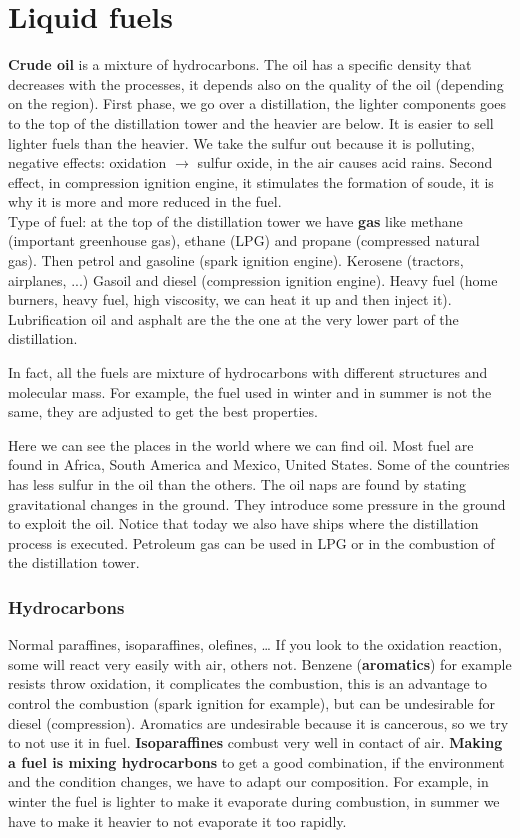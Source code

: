 \section{Liquid fuels}
	\textbf{Crude oil} is a mixture of hydrocarbons. The oil has a specific density that decreases with the processes, it depends also on the quality of the oil (depending on the region). First phase, we go over a distillation, the lighter components goes to the top of the distillation tower and the heavier are below. It is easier to sell lighter fuels than the heavier.
	We take the sulfur out because it is polluting, negative effects: oxidation $\rightarrow$ sulfur oxide, in the air causes acid rains. Second effect, in compression ignition engine, it stimulates the formation of soude, it is why it is more and more reduced in the fuel. \\
	
Type of fuel: at the top of the distillation tower we have \textbf{gas} like methane (important greenhouse gas), ethane (LPG) and propane (compressed natural gas). 
Then petrol and gasoline (spark ignition engine). Kerosene (tractors, airplanes, ...)
Gasoil and diesel (compression ignition engine). Heavy fuel (home burners, heavy fuel, high viscosity, we can heat it up and then inject it). Lubrification oil and
asphalt are the the one at the very lower part of the distillation. 

In fact, all the fuels are mixture of hydrocarbons with different structures and molecular mass. For example, the fuel used in winter and in summer is not the same, they are adjusted to get the best properties. 

Here we can see the places in the world where we can find oil. Most fuel are found in Africa, South America and Mexico, United States. Some of the countries has less sulfur in the oil than the others. The oil naps are found by stating gravitational changes in the ground. They introduce some pressure in the ground to exploit the oil. Notice that today we also have ships where the distillation process is executed. Petroleum gas can be used in LPG or in the combustion of the distillation tower. 

\subsubsection{Hydrocarbons}	
	Normal paraffines, isoparaffines, olefines, … If you look to the oxidation reaction, some will react very easily with air, others not. Benzene (\textbf{aromatics}) for example resists throw oxidation, it complicates the combustion, this is an advantage to control the combustion (spark ignition for example), but can be undesirable for diesel (compression). Aromatics are undesirable because it is cancerous, so we try to not use it in fuel. \textbf{Isoparaffines} combust very well in contact of air. \textbf{Making a fuel is mixing hydrocarbons} to get a good combination, if the environment and the condition changes, we have to adapt our composition. For example, in winter the fuel is lighter to make it evaporate during combustion, in summer we have to make it heavier to not evaporate it too rapidly. 
	
